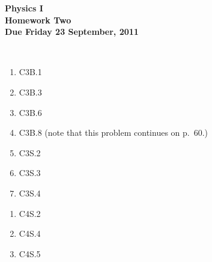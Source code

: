 \documentclass[12pt]{article}
\begin{document}
\pagestyle{empty}
 
\begin{center}
{\large {\bf Physics I}}\\
\medskip
{\large {\bf Homework Two}}\\
\medskip
{ {\bf Due Friday 23 September, 2011}}\\
\end{center}

\hspace{2mm}\\


\begin{enumerate}
\setlength{\itemsep}{-1mm}
  \item C3B.1
  \item C3B.3
  \item C3B.6
  \item C3B.8 (note that this problem continues on p.~60.)
  \item C3S.2
  \item C3S.3
  \item C3S.4
\end{enumerate}



\begin{enumerate}
\setlength{\itemsep}{-1mm}
  \item C4S.2
  \item C4S.4
  \item C4S.5
\end{enumerate}
\end{document}

